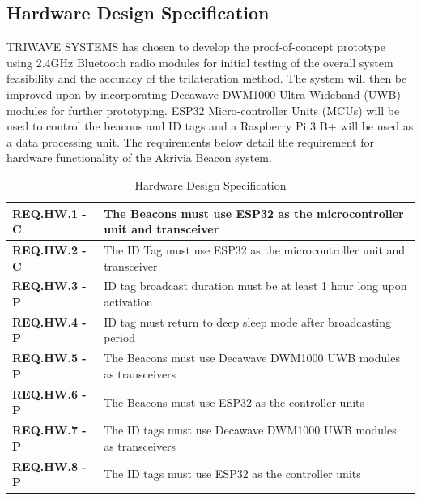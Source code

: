 \pagebreak
\subsection{Hardware Design Specification}
\medskip
TRIWAVE SYSTEMS has chosen to develop the proof-of-concept prototype using 2.4GHz Bluetooth radio modules for initial testing of the overall system feasibility and the accuracy of the trilateration method. The system will then be improved upon by incorporating Decawave DWM1000 Ultra-Wideband (UWB) modules for further prototyping. ESP32 Micro-controller Units (MCUs) will be used to control the beacons and ID tags and a Raspberry Pi 3 B+ will be used as a data processing unit. The requirements below detail the requirement for hardware functionality of the Akrivia Beacon system.

\medskip
\bgroup
\def\arraystretch{1.5}
\begin{table}[H]
\centering
\begin{tabular}{ | m{3cm} | m{12.5cm} |}
\hline
\textbf{REQ.HW.1 - C} & The Beacons must use ESP32 as the microcontroller unit and transceiver \\
\hline
\textbf{REQ.HW.2 - C} & The ID Tag must use ESP32 as the microcontroller unit and transceiver \\
\hline
\textbf{REQ.HW.3 - P} & ID tag broadcast duration must be at least 1 hour long upon activation\\
\hline
\textbf{REQ.HW.4 - P} & ID tag must return to deep sleep mode after broadcasting period\\
\hline
\textbf{REQ.HW.5 - P} & The Beacons must use Decawave DWM1000 UWB modules as transceivers\\
\hline
\textbf{REQ.HW.6 - P} & The Beacons must use ESP32 as the controller units\\
\hline
\textbf{REQ.HW.7 - P} & The ID tags must use Decawave DWM1000 UWB modules as transceivers\\
\hline
\textbf{REQ.HW.8 - P} & The ID tags must use ESP32 as the controller units\\
\hline
\end{tabular}
\caption{Hardware Design Specification}
\end{table}


